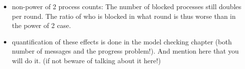 \documentclass[a4paper, 10pt]{article}
\begin{document}
\begin{itemize}
\begin{itemize}
%
%
%
%
%
%
			\item non-power of 2 process counts: The number of blocked processes still doubles per round. The ratio of who is blocked in what round is thus worse than in the power of 2 case.
			\item quantification of these effects is done in the model checking chapter (both number of messages and the progress problem!). And mention here that you will do it. (if not beware of talking about it here!)
		\end{itemize}
\end{itemize}
\end{document}
